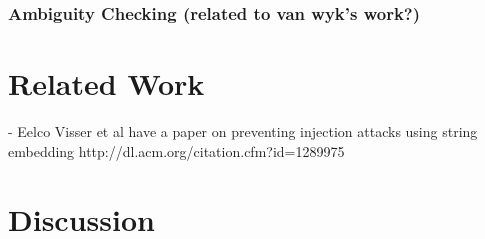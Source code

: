 \subsubsection{Ambiguity Checking (related to van wyk's work?)}
\section{Related Work}
- Eelco Visser et al have a paper on preventing injection attacks using string embedding http://dl.acm.org/citation.cfm?id=1289975
\section{Discussion}
%
%

